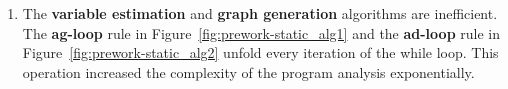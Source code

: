{\begin{itemize}
\begin{enumerate}
    This transformation is inefficient and unnecessary.
    The re-assignment problem can be resolved efficiently and accurately through other static program analysis techniques, such as the
    variable reachable analysis, etc..
    \item The \textbf{variable estimation} and \textbf{graph generation} algorithms are inefficient.
    The \textbf{ag-loop} rule in Figure~\ref{fig:prework-static_alg1}
   and the \textbf{ad-loop} rule in Figure~\ref{fig:prework-static_alg2}
   unfold every iteration of the while loop.
   This operation increased the complexity of the program analysis exponentially. 
    \end{enumerate}
\end{itemize}
}  

